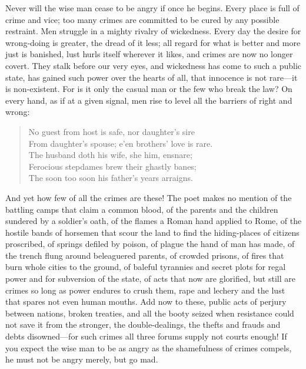 Never will the wise man cease to be angry if once he begins. Every
place is full of crime and vice; too many crimes are committed to be
cured by any possible restraint. Men struggle in a mighty rivalry of
wickedness. Every day the desire for wrong-doing is greater, the dread
of it less; all regard for what is better and more just is banished,
lust hurls itself wherever it likes, and crimes are now no longer
covert. They stalk before our very eyes, and wickedness has come to
such a public state, has gained such power over the hearts of all,
that innocence is not rare---it is non-existent. For is it only the
casual man or the few who break the law? On every hand, as if at a
given signal, men rise to level all the barriers of right and wrong:

\begin{verse}
No guest from host is safe, nor daughter's sire\\
From daughter's spouse; e'en brothers' love is rare.\\
The husband doth his wife, she him, ensnare;\\
Ferocious stepdames brew their ghastly banes;\\
The soon too soon his father's years arraigns.
\end{verse}

\noindent And yet how few of all the crimes are these! The poet makes
no mention of the battling camps that claim a common blood, of the
parents and the children sundered by a soldier's oath, of the flames a
Roman hand applied to Rome, of the hostile bands of horsemen that
scour the land to find the hiding-places of citizens proscribed, of
springs defiled by poison, of plague the hand of man has made, of the
trench flung around beleaguered parents, of crowded prisons, of
 fires that burn whole cities to the ground, of baleful
tyrannies and secret plots for regal power and for subversion of the
state, of acts that now are glorified, but still are crimes so long as
power endures to crush them, rape and lechery and the lust that spares
not even human mouths. Add now to these, public acts of perjury
between nations, broken treaties, and all the booty seized when
resistance could not save it from the stronger, the double-dealings,
the thefts and frauds and debts dis\-owned---for such crimes all three
forums supply not courts enough! If you expect the wise man to be as
angry as the shamefulness of crimes compels, he must not be angry
merely, but go mad.


